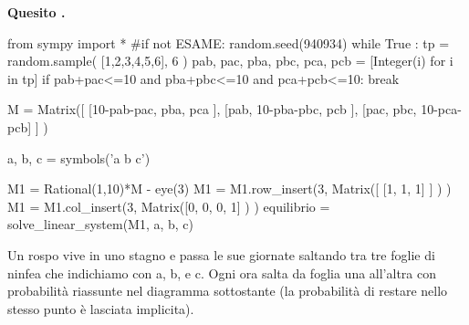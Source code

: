 \documentclass[11pt,twoside,a4paper]{article}
\def\Pr{{\rm Pr\,}}
\newcounter{quesito}
\newenvironment{question}{\bigskip\addtocounter{quesito}{1}\par\textbf{Quesito \thequesito.}}{\vspace{\parskip}}
\begin{document}
\clearpage
\begin{question}
\def\Pr{{\rm Pr\,}}
\def\pyl#1{\py{latex(#1) } }
\everymath{\displaystyle}
\def\nicefrac#1#2{#1/#2}
\renewcommand{\arraystretch}{1.3}
\begin{pycode}
from sympy import *
#if not ESAME: 
random.seed(940934)
while True :
    tp  =  random.sample( [1,2,3,4,5,6], 6 ) 
    pab, pac, pba, pbc, pca, pcb = [Integer(i) for i in tp] 
    if pab+pac<=10 and pba+pbc<=10 and pca+pcb<=10: break
    
M = Matrix([ [10-pab-pac, pba,        pca       ],
             [pab,         10-pba-pbc, pcb       ],
             [pac,         pbc,        10-pca-pcb] ] )
    
a, b, c = symbols('a b c')

M1 = Rational(1,10)*M - eye(3)
M1 = M1.row_insert(3, Matrix([ [1, 1, 1] ] ) )
M1 = M1.col_insert(3, Matrix([0, 0, 0, 1] ) )
equilibrio = solve_linear_system(M1, a, b, c)

\end{pycode}
Un rospo vive in uno stagno e passa le sue giornate saltando tra tre foglie di ninfea che indichiamo con {\sf a}, {\sf b}, e {\sf c}. Ogni ora salta da foglia una all'altra con probabilità riassunte nel diagramma sottostante (la probabilità di restare nello stesso punto è lasciata implicita). 




\hfil
{}


\end{question}
\end{document}
